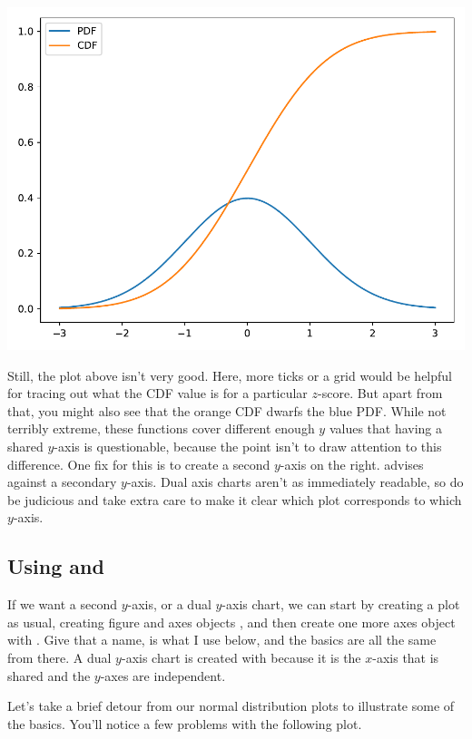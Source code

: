 
\begin{center}
    \includegraphics[width = .7\textwidth]{figures/proseplots/cdf-pdf.pdf}
\end{center}

Still, the plot above isn't very good. Here, more ticks or a grid would be helpful for tracing out what the CDF value is for a particular $z$-score. But apart from that, you might also see that the orange CDF dwarfs the blue PDF. While not terribly extreme, these functions cover different enough $y$ values that having a shared $y$-axis is questionable, because the point isn't to draw attention to this difference. One fix for this is to create a second $y$-axis on the right. \cite{knaflic2015storytelling} advises against a secondary $y$-axis. Dual axis charts aren't as immediately readable, so do be judicious and take extra care to make it clear which plot corresponds to which $y$-axis.

\subsection{Using  and }

If we want a second $y$-axis, or a dual $y$-axis chart, we can start by creating a plot as usual, creating figure and axes objects , and then create one more axes object with . Give that a name,  is what I use below, and the basics are all the same from there. A dual $y$-axis chart is created with  because it is the $x$-axis that is shared and the $y$-axes are independent. 

Let's take a brief detour from our normal distribution plots to illustrate some of the basics. You'll notice a few problems with the following plot. 

